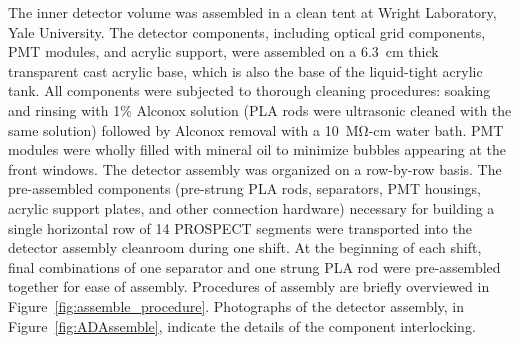The inner detector volume was assembled in a clean tent at Wright Laboratory, Yale University. 
The detector components, including optical grid components, PMT modules, and acrylic support, were assembled on a 6.3~cm thick transparent cast acrylic base, which is also the base of the liquid-tight acrylic tank. 
All components were subjected to thorough cleaning procedures: soaking and rinsing with 1\% Alconox solution (PLA rods were ultrasonic cleaned with the same solution) followed by Alconox removal with a 10~$\mathrm{M\Omega}$-cm water bath.
PMT modules were wholly filled with mineral oil to minimize bubbles appearing at the front windows.
The detector assembly was organized on a row-by-row basis.
The pre-assembled components (pre-strung PLA rods, separators, PMT housings, acrylic support plates, and other connection hardware) necessary for building a single horizontal row of 14 PROSPECT segments were transported into the detector assembly cleanroom during one shift. 
At the beginning of each shift, final combinations of one separator and one strung PLA rod were pre-assembled together for ease of assembly.
Procedures of assembly are briefly overviewed in Figure~\ref{fig:assemble_procedure}.
Photographs of the detector assembly, in Figure~\ref{fig:ADAssemble}, indicate the details of the component interlocking.

